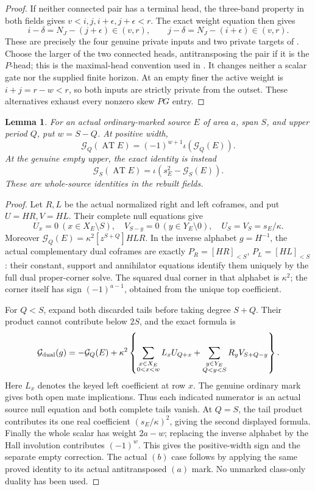 \documentclass[11pt,a4paper]{amsart}
\numberwithin{equation}{section}
\theoremstyle{plain}
\newtheorem{lemma}[theorem]{Lemma}
\theoremstyle{definition}
\newcommand{\Q}{\mathbb Q}
\newcommand{\AT}{\operatorname{AT}}
\newcommand{\ii}{\iota}
\begin{document}
\begin{proof}
If neither connected pair has a terminal head, the three-band property
in both fields gives
\(v<i,j,i+\epsilon,j+\epsilon<r\).
The exact weight equation then gives
\[
 i-\delta=N_J-(j+\epsilon)\in(v,r),\qquad
 j-\delta=N_J-(i+\epsilon)\in(v,r).
\]
These are precisely the four genuine private inputs and two private
targets of .
Choose the larger of the two connected heads, antitransposing the pair
if it is the \(P\)-head; this is the maximal-head convention used in
.  It changes neither a scalar gate nor
the supplied finite horizon.
At an empty finer the active weight is \(i+j=r-w<r\), so both
inputs are strictly private from the outset.  These alternatives
exhaust every nonzero skew \(PG\) entry.
\end{proof}
\begin{lemma}\label{ph:structured-dual}
For an actual ordinary-marked source \(E\) of area \(a\), span \(S\),
and upper period \(Q\), put \(w=S-Q\).
At positive width,
\[
 \mathcal G_Q(\AT E)=(-1)^{w+1}\ii(\mathcal G_Q(E)).
\]
At the genuine empty upper, the exact identity is instead
\[
 \mathcal G_S(\AT E)=\ii(s_E^2-\mathcal G_S(E)).
\]
These are whole-source identities in the rebuilt fields.
\end{lemma}
\begin{proof}
Let \(R,L\) be the actual normalized right and left coframes, and put
\(U=HR,V=HL\).
Their complete null equations give
\[
 U_x=0\ (x\in X_E\setminus S),\quad
 V_{S-y}=0\ (y\in Y_E\setminus0),\quad
 U_S=V_S=s_E/\kappa.
\]
Moreover \(\mathcal G_Q(E)=\kappa^2[z^{S+Q}]HLR\).
In the inverse alphabet \(g=H^{-1}\), the actual complementary dual
coframes are exactly \(P_R=[HR]_{<S}\), \(P_L=[HL]_{<S}\):
their constant, support and annihilator equations identify them
uniquely by the full dual proper-corner solve.
The squared dual corner in that alphabet is \(\kappa^2\); the corner
itself has sign \((-1)^{a-1}\), obtained from the unique top coefficient.

For \(Q<S\), expand both discarded tails before taking degree \(S+Q\).
Their product cannot contribute below \(2S\), and the exact formula is
\[
 \mathcal G_{\rm dual}(g)
   =-\mathcal G_Q(E)+\kappa^2
       \left\{\sum_{\substack{x\in X_E\\0<x<w}}L_xU_{Q+x}
            +\sum_{\substack{y\in Y_E\\Q<y<S}}R_yV_{S+Q-y}\right\}.
\]
Here \(L_x\) denotes the keyed left coefficient at row \(x\).
The genuine ordinary mark gives both open mate implications.
Thus each indicated numerator is an actual source null equation and
both complete tails vanish.
At \(Q=S\), the tail product contributes its one real coefficient
\((s_E/\kappa)^2\), giving the second displayed formula.
Finally the whole scalar has weight \(2a-w\); replacing the inverse
alphabet by the Hall involution contributes \((-1)^w\).
This gives the positive-width sign and the separate empty correction.
The actual \((b)\) case follows by applying the same proved identity
to its actual antitransposed \((a)\) mark.  No unmarked class-only
duality has been used.
\end{proof}
\end{document}
